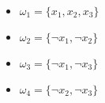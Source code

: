\begin{minipage}[c]{0.23\linewidth}
           \footnotesize
		\begin{itemize}
			\item[] $\omega_1 = \{x_1, x_2, x_3\}$ \\
			\item[] $\omega_2 = \{\neg x_1, \neg x_2 \}$\\
			\item[] $\omega_3 = \{\neg x_1, \neg x_3 \}$\\
			\item[] $\omega_4 = \{\neg x_2, \neg x_3 \}$\\
		\end{itemize}
\end{minipage}
